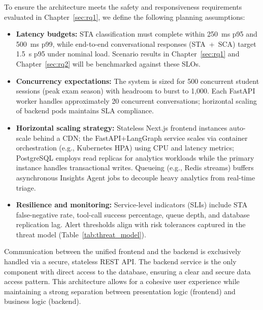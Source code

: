 To ensure the architecture meets the safety and responsiveness requirements evaluated in Chapter~\ref{sec:rq1}, we define the following planning assumptions:
\begin{itemize}
    \item \textbf{Latency budgets:} STA classification must complete within 250~ms p95 and 500~ms p99, while end-to-end conversational responses (STA~+~SCA) target 1.5~s p95 under nominal load. Scenario results in Chapter~\ref{sec:rq1} and Chapter~\ref{sec:rq2} will be benchmarked against these SLOs.
    \item \textbf{Concurrency expectations:} The system is sized for 500 concurrent student sessions (peak exam season) with headroom to burst to 1,000. Each FastAPI worker handles approximately 20 concurrent conversations; horizontal scaling of backend pods maintains SLA compliance.
    \item \textbf{Horizontal scaling strategy:} Stateless Next.js frontend instances auto-scale behind a CDN; the FastAPI+LangGraph service scales via container orchestration (e.g., Kubernetes HPA) using CPU and latency metrics; PostgreSQL employs read replicas for analytics workloads while the primary instance handles transactional writes. Queueing (e.g., Redis streams) buffers asynchronous Insights Agent jobs to decouple heavy analytics from real-time triage.
    \item \textbf{Resilience and monitoring:} Service-level indicators (SLIs) include STA false-negative rate, tool-call success percentage, queue depth, and database replication lag. Alert thresholds align with risk tolerances captured in the threat model (Table~\ref{tab:threat_model}).\cite{FIND_CITATION_PLACEHOLDER}
\end{itemize}

Communication between the unified frontend and the backend is exclusively handled via a secure, stateless REST API. The backend service is the only component with direct access to the database, ensuring a clear and secure data access pattern. This architecture allows for a cohesive user experience while maintaining a strong separation between presentation logic (frontend) and business logic (backend).

